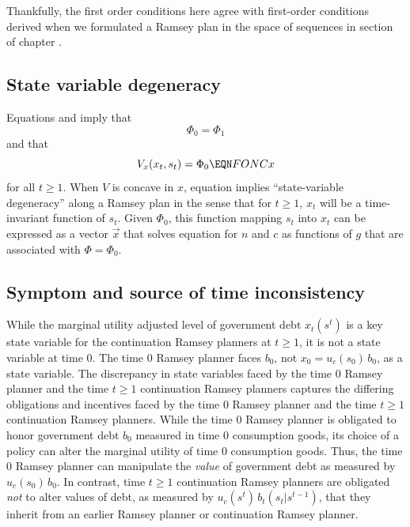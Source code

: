 Thankfully, the first order conditions  here   agree with  first-order conditions    derived
 when we   formulated
a Ramsey plan in the space of sequences in section  of chapter .

\subsection{State variable degeneracy}
Equations  and    imply that
$$ \Phi_0 = \Phi_1$$
and that
$$ V_x(x_t, s_t) = \Phi_0   \EQN FONCx $$
for all $t \geq 1$.
When $V$ is concave in $x$, equation  implies  ``state-variable degeneracy'' along a Ramsey plan in the sense that
 for $t \geq 1$,
$x_t$ will be a time-invariant function of $s_t$.  Given $\Phi_0$, this function mapping $s_t$
into $x_t$  can be expressed as a vector $\vec x$ that solves
equation  for  $n$ and $c$ as functions of $g$ that are associated
with $\Phi = \Phi_0$.





\subsection{Symptom and source  of time inconsistency}

While the marginal utility adjusted level of government debt $x_t(s^t)$ is  a key state variable for the continuation Ramsey planners at  $t \geq 1$,
it is  not a state variable at time $0$.  The time $0$ Ramsey planner faces $b_0$,  not $x_0 = u_{c}(s_0)\, b_0$, as a state variable.
The discrepancy in state variables faced by the time $0$ Ramsey planner and the  time $t \geq 1$ continuation
Ramsey planners captures the differing obligations and incentives
faced by the time $0$ Ramsey planner and the time $t \geq 1$ continuation Ramsey planners.  While the time $0$ Ramsey
planner is obligated to honor government  debt $b_0$  measured in time $0$ consumption goods,
its choice of a policy  can alter the marginal utility of time $0$ consumption goods.  Thus, the time $0$ Ramsey planner can manipulate
the {\it value\/} of government debt as measured by $u_{c}(s_0)\, b_0$.  In contrast, time $t \geq 1$ continuation Ramsey planners
are obligated {\it not\/} to alter  values of  debt, as measured by $u_{c}(s^t)\, b_t(s_t | s^{t-1})$, that they inherit from an earlier Ramsey planner or continuation Ramsey planner.

